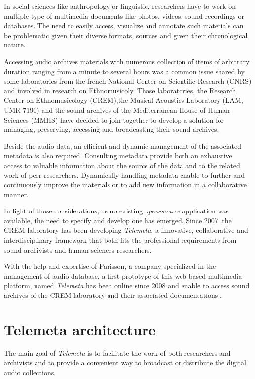 \documentclass[runningheads,a4paper]{llncs}
\begin{document}
In social sciences like anthropology or linguistic, researchers have to work on multiple type of multimedia documents like photos, videos, sound recordings or databases. The need to easily access, visualize and annotate such materials can be problematic given their diverse formats, sources and given their chronological nature.

Accessing audio archives materials with numerous collection of items of arbitrary duration ranging from a minute to several hours was a common issue shared by some laboratories from the french National Center on Scientific Research (CNRS) and involved in research on Ethnomusicoly. Those laboratories, the Research Center on Ethnomusicology (CREM),the Musical Acoustics Laboratory (LAM, UMR 7190) and the sound archives of the Mediterranean House of Human Sciences (MMHS) have decided to join together to develop a solution for managing, preserving, accessing and broadcasting their sound archives.

Beside the audio data, an efficient and dynamic management of the associated metadata is also required. Consulting metadata provide both an exhaustive access to valuable information about the source of the data and to the related work of peer researchers. Dynamically handling metadata enable to further and continuously improve the materials or to add new information in a collaborative manner. 

In light of those considerations, as no existing \emph{open-source} application was available, the need to specify and develop one has emerged. Since 2007, the CREM laboratory has been developing \emph{Telemeta}, a innovative, collaborative and interdisciplinary framework that both fits the professional requirements from sound archivists and human sciences researchers.

With the help and expertise of Parisson, a company specialized in the management of audio database, a first prototype of this web-based multimedia platform, named \emph{Telemeta} has been online since 2008 and enable to access sound archives of the CREM laboratory and their associated documentations \cite{telemetaCREM}.%
 
\section{Telemeta architecture}

  
The main goal of \emph{Telemeta} is to facilitate the work of both researchers and archivists and to provide a convenient way to broadcast or distribute the digital audio collections.
\end{document}
